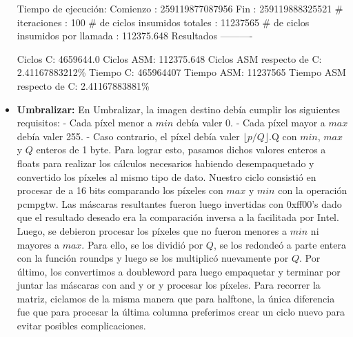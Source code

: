 \documentclass[10pt, a4paper]{article}
\begin{document}
\begin{itemize}
Tiempo de ejecución:\newline
  Comienzo                          : 259119877087956\newline
  Fin                               : 259119888325521\newline
  \# iteraciones                     : 100\newline
  \# de ciclos insumidos totales     : 11237565\newline
  \# de ciclos insumidos por llamada : 112375.648\newline
\newline
Resultados\newline
----------

Ciclos C:                 4659644.0\newline
Ciclos ASM:               112375.648\newline
Ciclos ASM respecto de C: 2.41167883212\%\newline
Tiempo C:                 465964407\newline
Tiempo ASM:               11237565\newline
Tiempo ASM respecto de C: 2.41167883881\%\newline

\item {\textbf{Umbralizar:}}
En Umbralizar, la imagen destino debía cumplir los siguientes requisitos:\newline
- Cada píxel menor a $min$ debía valer 0.\newline
- Cada píxel mayor a $max$ debía valer 255.\newline
- Caso contrario, el píxel debía valer $\lfloor p/Q \rfloor$.Q\newline
con $min$, $max$ y $Q$ enteros de 1 byte.\newline
Para lograr esto, pasamos dichos valores enteros a floats para realizar los cálculos necesarios habiendo desempaquetado y convertido los píxeles al mismo tipo de dato.\newline
Nuestro ciclo consistió en procesar de a 16 bits comparando los píxeles con $max$ y $min$ con la operación pcmpgtw. Las máscaras resultantes fueron luego invertidas con 0xff00's dado que el resultado deseado era la comparación inversa a la facilitada por Intel. Luego, se debieron procesar los píxeles que no fueron menores a $min$ ni mayores a $max$. Para ello, se los dividió por $Q$, se los redondeó a parte entera con la función roundps y luego se los multiplicó nuevamente por $Q$. Por último, los convertimos a doubleword para luego empaquetar y terminar por juntar las máscaras con and y or y procesar los píxeles.\newline
Para recorrer la matriz, ciclamos de la misma manera que para halftone, la única diferencia fue que para procesar la última columna preferimos crear un ciclo nuevo para evitar posibles complicaciones.


\end{itemize}
\end{document}
